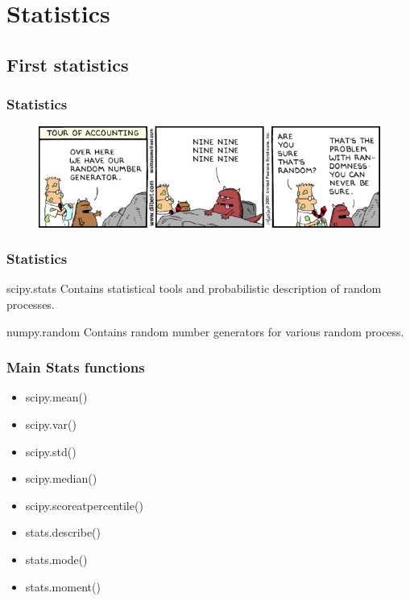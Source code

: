 \documentclass[10pt,colorlinks]{beamer}
\begin{document}
\section{Statistics}
\subsection{First statistics} %
\label{ssub:First statistics}

\begin{frame}[fragile]\frametitle{Statistics}
\begin{figure}[!htb]
    \includegraphics[width=\textwidth]{figs/nine}
\end{figure}
\end{frame}



\begin{frame}[fragile]\frametitle{Statistics}
    \begin{block}{scipy.stats}
    Contains statistical tools and probabilistic description of random processes.
    \end{block}  
   \pause \begin{block}{numpy.random}
    Contains random number generators for various random process. 
    \end{block}
\end{frame}
\begin{frame}[fragile]\frametitle{Main Stats functions}
    \begin{itemize}
        \item scipy.mean()
        \item scipy.var()
        \item scipy.std()
        \item scipy.median()
        \item scipy.scoreatpercentile()
        \item stats.describe() 
        \item stats.mode()
        \item stats.moment()
   \end{itemize}
\end{frame}
\end{document}
